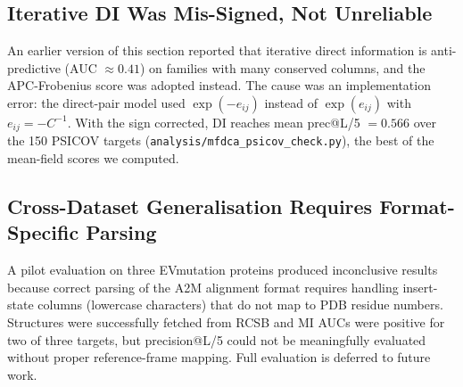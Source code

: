 \subsection{Iterative DI Was Mis-Signed, Not Unreliable}
An earlier version of this section reported that iterative direct
information is anti-predictive (AUC $\approx 0.41$) on families with many
conserved columns, and the APC-Frobenius score was adopted instead.  The
cause was an implementation error: the direct-pair model used
$\exp(-e_{ij})$ instead of $\exp(e_{ij})$ with $e_{ij} = -C^{-1}$.  With the
sign corrected, DI reaches mean prec@L/5 $= 0.566$ over the 150 PSICOV
targets (\texttt{analysis/mfdca\_psicov\_check.py}), the best of the
mean-field scores we computed.

\subsection{Cross-Dataset Generalisation Requires Format-Specific Parsing}
A pilot evaluation on three EVmutation proteins produced inconclusive results
because correct parsing of the A2M alignment format requires handling
insert-state columns (lowercase characters) that do not map to PDB residue
numbers.  Structures were successfully fetched from RCSB and MI AUCs were
positive for two of three targets, but precision@L/5 could not be meaningfully
evaluated without proper reference-frame mapping.  Full evaluation is deferred
to future work.
